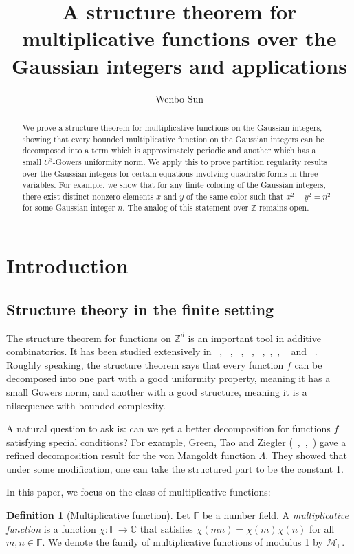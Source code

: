 \documentclass[12pt,amstex]{amsart}
\title[A structure theorem for multiplicative functions and applications]{A structure theorem for multiplicative functions over the Gaussian integers and applications}
\author{Wenbo Sun}
\theoremstyle{definition}
\newtheorem{defn}[thm]{Definition}
\begin{document}
\maketitle

\begin{abstract}
We prove a structure theorem for multiplicative functions on the Gaussian integers, showing that every bounded multiplicative function on the Gaussian integers can be decomposed into a term which is approximately periodic and another which has a small $U^{3}$-Gowers uniformity norm. We apply this to prove partition regularity results over the Gaussian integers for certain equations involving quadratic forms in three variables. For example, we show that for any finite coloring of the Gaussian integers, there exist distinct nonzero elements $x$ and $y$ of the same color such that $x^{2}-y^{2}=n^{2}$ for some Gaussian integer $n$. The analog of this statement over $\mathbb{Z}$ remains open.
\end{abstract}

\section{Introduction}
\subsection{Structure theory in the finite setting}
The structure theorem for functions on $\mathbb{Z}^{d}$ is an important tool in additive combinatorics. It has been studied extensively in ~\cite{FH}, ~\cite{14}, ~\cite{15}, ~\cite{22}, ~\cite{5},~\cite{7},~\cite{6}, ~\cite{Sz} and ~\cite{T}. Roughly speaking, the structure theorem says that every function $f$ can be decomposed into one part with a good uniformity property, meaning it has a small Gowers norm, and another with a good structure, meaning it is a nilsequence with bounded complexity.

A natural question to ask is: can we get a better decomposition for functions $f$ satisfying special conditions? For example, Green, Tao and Ziegler (~\cite{5},~\cite{7},~\cite{6}) gave a refined decomposition result for the von Mangoldt function $\Lambda$. They showed that under some modification, one can take the structured part to be the constant 1.

In this paper, we focus on the class of multiplicative functions:

\begin{defn}[Multiplicative function]
  Let $\mathbb{F}$ be a number field. A \emph{multiplicative function} is a function $\chi\colon\mathbb{F}\rightarrow\mathbb{C}$ that satisfies $\chi(mn)=\chi(m)\chi(n)$ for all $m,n\in\mathbb{F}$. We denote the family of multiplicative functions of modulus 1 by $\mathcal{M}_{\mathbb{F}}$.
\end{defn}
\end{document}
